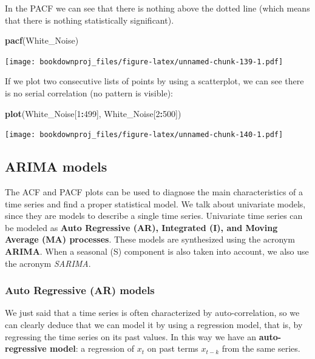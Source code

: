 \documentclass[
]{article}
\newenvironment{Shaded}{\begin{snugshade}}{\end{snugshade}}
\newcommand{\DecValTok}[1]{\textcolor[rgb]{0.00,0.00,0.81}{#1}}
\newcommand{\KeywordTok}[1]{\textcolor[rgb]{0.13,0.29,0.53}{\textbf{#1}}}
\newcommand{\NormalTok}[1]{#1}
\newcommand{\OperatorTok}[1]{\textcolor[rgb]{0.81,0.36,0.00}{\textbf{#1}}}
\begin{document}
In the PACF we can see that there is nothing above the dotted line (which means that there is nothing statistically significant).

\begin{Shaded}
\begin{Highlighting}[]
\KeywordTok{pacf}\NormalTok{(White_Noise)}
\end{Highlighting}
\end{Shaded}

\texttt{[image: bookdownproj\_files/figure-latex/unnamed-chunk-139-1.pdf]}

If we plot two consecutive lists of points by using a scatterplot, we can see there is no serial correlation (no pattern is visible):

\begin{Shaded}
\begin{Highlighting}[]
\KeywordTok{plot}\NormalTok{(White_Noise[}\DecValTok{1}\OperatorTok{:}\DecValTok{499}\NormalTok{], White_Noise[}\DecValTok{2}\OperatorTok{:}\DecValTok{500}\NormalTok{])}
\end{Highlighting}
\end{Shaded}

\texttt{[image: bookdownproj\_files/figure-latex/unnamed-chunk-140-1.pdf]}

\hypertarget{arima-models}{%
\subsection{ARIMA models}\label{arima-models}}

The ACF and PACF plots can be used to diagnose the main characteristics of a time series and find a proper statistical model. We talk about univariate models, since they are models to describe a single time series. Univariate time series can be modeled as \textbf{Auto Regressive (AR), Integrated (I), and Moving Average (MA) processes}. These models are synthesized using the acronym \textbf{ARIMA}. When a seasonal (S) component is also taken into account, we also use the acronym \emph{SARIMA}.

\hypertarget{auto-regressive-ar-models}{%
\subsubsection{Auto Regressive (AR) models}\label{auto-regressive-ar-models}}

We just said that a time series is often characterized by auto-correlation, so we can clearly deduce that we can model it by using a regression model, that is, by regressing the time series on its past values. In this way we have an \textbf{auto-regressive model}: a regression of \(x_{t}\) on past terms \(x_{t-k}\) from the same series.
\end{document}
